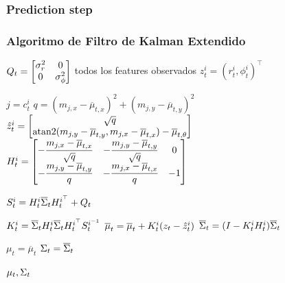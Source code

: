 \begin{frame}
	\frametitle{Prediction step}
	
	
	
\end{frame}

\begin{frame}
	\frametitle{Algoritmo de Filtro de Kalman Extendido}
	\footnotesize
 	\begin{algorithmic}[1]
		\State
		$ Q_{t} =
			\begin{bmatrix}
				\sigma_{r}^{2} & 0\\
				0 & \sigma_{\phi}^{2}
			\end{bmatrix}
		$
		\For todos los features observados $z_{t}^{i} = (r_{t}^{i}, \phi_{t}^{i})^{\top}$
		
		\State $ j = c_{t}^{i}$
		\State $ q = (m_{j,x}-\overline{\mu}_{t,x})^{2} + (m_{j,y}-\overline{\mu}_{t,y})^{2} $
		\State
		$ \hat{z}_{t}^{i} =
			\begin{bmatrix}
				\sqrt{q}\\
				\operatorname{atan2}(m_{j,y}-\overline{\mu}_{t,y}, m_{j,x}-\overline{\mu}_{t,x}) - \overline{\mu}_{t,\theta}
			\end{bmatrix}
		$
		\State
		$ H_{t}^{i} = 
			\begin{bmatrix}
				-\dfrac{m_{j,x} - \overline{\mu}_{t,x}}{\sqrt{q}} & -\dfrac{m_{j,y} - \overline{\mu}_{t,y}}{\sqrt{q}}  & 0\\
				-\dfrac{m_{j,y} - \overline{\mu}_{t,y}}{q}  & -\dfrac{m_{j,x} - \overline{\mu}_{t,x}}{q}  & -1
			\end{bmatrix}
		$
		
		\State $S_{t}^{i} = H_{t}^{i} \overline{\Sigma}_{t} H_{t}^{i^{\top}} + Q_{t} $

		\State $K_{t}^{i} = \overline{\Sigma}_{t} {H_{t}^{i}} \overline{\Sigma}_{t} H_{t}^{i^{\top}} S_{t}^{i^{-1}} $
		\State $\overline{\mu}_{t} = \overline{\mu}_{t} + K_{t}^{i}(z_{t} - \hat{z}_{t}^{i})$
		\State $\overline{\Sigma}_{t} = (I - K_{t}^{i}H_{t}^{i})\overline{\Sigma}_{t}$
		
		\EndFor
		\State $\mu_{t} = \overline{\mu}_{t}$
		\State $\Sigma_{t} = \overline{\Sigma}_{t}$
		
		\State \Return $\mu_{t}, \Sigma_{t}$
	\end{algorithmic}
	
	
\end{frame}

